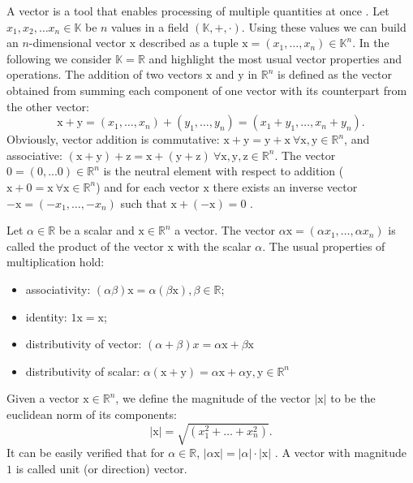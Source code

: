 \par A vector is a tool that enables processing of multiple quantities at once \cite{IntroVec}. Let $x_1, x_2, \ldots x_n \in \mathbb{K}$ be $n$ values in a field $(\mathbb{K},+,\cdot)$. Using these values we can build an $n$-dimensional vector $\mathrm{x}$ described as a tuple $\mathrm{x} = (x_1, \ldots,x_n)\in\mathbb{K}^n$. In the following we consider $\mathbb{K} = \mathbb{R}$ and highlight the most usual vector properties and operations.
The addition of two vectors $\mathrm{x}$ and $\mathrm{y}$ in $\mathbb{R}^n$ is defined as the vector obtained from summing each component of one vector with its counterpart from the other vector:
$$\mathrm{x}+\mathrm{y} = (x_1,\ldots,x_n)+(y_1,\ldots,y_n)=(x_1+y_1,\ldots,x_n+y_n).$$
Obviously, vector addition is commutative: $\mathrm{x}+\mathrm{y}=\mathrm{y}+\mathrm{x} \ \forall \mathrm{x},\mathrm{y}\in\mathbb{R}^n $, and associative: $(\mathrm{x}+\mathrm{y})+\mathrm{z}=\mathrm{x}+(\mathrm{y}+\mathrm{z}) \ \forall \mathrm{x},\mathrm{y},\mathrm{z}\in\mathbb{R}^n $. The vector $\mathrm{0}=(0,...0)\in \mathbb{R}^n$ is the neutral element with respect to addition ($\mathrm{x}+\mathrm{0}=\mathrm{x}\ \forall \mathrm{x} \in\mathbb{R}^n $) and for each vector $\mathrm{x}$ there exists an inverse vector $-\mathrm{x}=(-x_1,\ldots,-x_n)$ such that $\mathrm{x}+(-\mathrm{x})=\mathrm{0}$ \cite{IntroVec}.

Let $\alpha\in\mathbb{R}$ be a scalar and $\mathrm{x}\in\mathbb{R}^n$ a vector. The vector $\alpha\mathrm{x}=(\alpha x_1,\ldots,\alpha x_n)$ is called the 
product of the vector $\mathrm{x}$ with the scalar $\alpha$. The usual properties of multiplication \cite{IntroVec} hold:
\begin{itemize}
\item associativity: $(\alpha\beta)\mathrm{x} = \alpha(\beta\mathrm{x}), \beta\in \mathbb{R}$;
\item identity: $\mathrm{1}\mathrm{x}=\mathrm{x}$;
\item distributivity of vector: $(\alpha+\beta)\mathrm{}{x}=\alpha\mathrm{x}+\beta\mathrm{x}$
\item distributivity of scalar:
$\alpha(\mathrm{x}+\mathrm{y})=\alpha\mathrm{x}+\alpha\mathrm{y}, \mathrm{y}\in\mathbb{R}^n$
\end{itemize} 

\par Given a vector $\mathrm{x}\in\mathbb{R}^n$, we define the magnitude of the vector $|\mathrm{x}|$ to be the euclidean norm of its components:
$$ |\mathrm{x}| = \sqrt{(x_1^2 + \ldots + x_n^2)}. $$
It can be easily verified that for $\alpha\in\mathbb{R}$, $|\alpha \mathrm{x}|=|\alpha|\cdot|\mathrm{x}|$ \cite{IntroVec}. A vector with magnitude $1$ is called unit (or direction) vector. 

